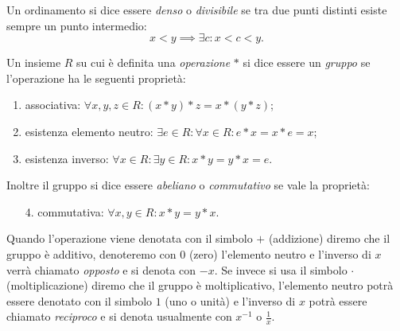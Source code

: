 \begin{definition}
  \label{def:ordinamento_denso}%
  Un ordinamento si dice essere
  \emph{denso}%
%
 o \emph{divisibile} 
  se tra due punti distinti esiste sempre un punto intermedio:
  \[
   x < y \implies \exists c \colon x < c < y.
  \]
\end{definition}


\begin{definition}[gruppo]
  \label{def:gruppo}%
  Un insieme $R$ su cui è definita una \emph{operazione} $*$ 
  si dice essere un \emph{gruppo}%
%
 se l'operazione
  ha le seguenti proprietà:
  \begin{enumerate}
    \item associativa: $\forall x,y,z\in R\colon (x*y)*z = x*(y*z)$;
    \item esistenza elemento neutro: 
    $\exists e\in R\colon \forall x\in R \colon e*x=x*e = x$;
    \item esistenza inverso: 
    $\forall x\in R\colon \exists y\in R\colon x*y=y*x=e$.
  \end{enumerate}
  Inoltre il gruppo si dice essere \emph{abeliano}%
%
 o \emph{commutativo}
  se vale la proprietà:
  \begin{enumerate}
    \item[4.] commutativa: $\forall x,y\in R\colon x*y = y*x$.
  \end{enumerate}
  
  Quando l'operazione viene denotata con il simbolo $+$ (addizione)
  diremo che il gruppo è additivo, denoteremo con $0$ 
  (zero) l'elemento neutro e l'inverso di $x$ verrà chiamato \emph{opposto}
  e si denota con $-x$.
  Se invece si usa il simbolo $\cdot$ (moltiplicazione)
  diremo che il gruppo è moltiplicativo, l'elemento neutro potrà 
  essere denotato con il simbolo $1$ (uno o unità) e 
  l'inverso di $x$ potrà essere chiamato \emph{reciproco}
  e si denota usualmente con $x^{-1}$ o $\frac 1 x$.
  \end{definition}
  

